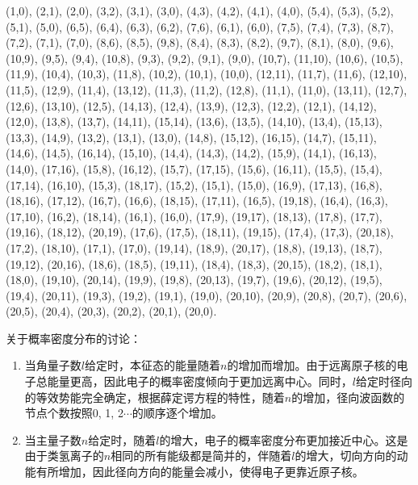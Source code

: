 \begin{enumerate}[label=\textbf{5.\arabic*}, listparindent=\parindent]
\begin{small}
\noindent(1,0), (2,1), (2,0), (3,2), (3,1), (3,0), (4,3), (4,2), (4,1), (4,0), (5,4), (5,3), (5,2), (5,1), (5,0), (6,5), (6,4), (6,3), (6,2), (7,6), (6,1), (6,0), (7,5), (7,4), (7,3), (8,7), (7,2), (7,1), (7,0), (8,6), (8,5), (9,8), (8,4), (8,3), (8,2), (9,7), (8,1), (8,0), (9,6), (10,9), (9,5), (9,4), (10,8), (9,3), (9,2), (9,1), (9,0), (10,7), (11,10), (10,6), (10,5), (11,9), (10,4), (10,3), (11,8), (10,2), (10,1), (10,0), (12,11), (11,7), (11,6), (12,10), (11,5), (12,9), (11,4), (13,12), (11,3), (11,2), (12,8), (11,1), (11,0), (13,11), (12,7), (12,6), (13,10), (12,5), (14,13), (12,4), (13,9), (12,3), (12,2), (12,1), (14,12), (12,0), (13,8), (13,7), (14,11), (15,14), (13,6), (13,5), (14,10), (13,4), (15,13), (13,3), (14,9), (13,2), (13,1), (13,0), (14,8), (15,12), (16,15), (14,7), (15,11), (14,6), (14,5), (16,14), (15,10), (14,4), (14,3), (14,2), (15,9), (14,1), (16,13), (14,0), (17,16), (15,8), (16,12), (15,7), (17,15), (15,6), (16,11), (15,5), (15,4), (17,14), (16,10), (15,3), (18,17), (15,2), (15,1), (15,0), (16,9), (17,13), (16,8), (18,16), (17,12), (16,7), (16,6), (18,15), (17,11), (16,5), (19,18), (16,4), (16,3), (17,10), (16,2), (18,14), (16,1), (16,0), (17,9), (19,17), (18,13), (17,8), (17,7), (19,16), (18,12), (20,19), (17,6), (17,5), (18,11), (19,15), (17,4), (17,3), (20,18), (17,2), (18,10), (17,1), (17,0), (19,14), (18,9), (20,17), (18,8), (19,13), (18,7), (19,12), (20,16), (18,6), (18,5), (19,11), (18,4), (18,3), (20,15), (18,2), (18,1), (18,0), (19,10), (20,14), (19,9), (19,8), (20,13), (19,7), (19,6), (20,12), (19,5), (19,4), (20,11), (19,3), (19,2), (19,1), (19,0), (20,10), (20,9), (20,8), (20,7), (20,6), (20,5), (20,4), (20,3), (20,2), (20,1), (20,0).
\end{small}

关于概率密度分布的讨论：
\begin{enumerate}
    \item 当角量子数$l$给定时，本征态的能量随着$n$的增加而增加。由于远离原子核的电子总能量更高，因此电子的概率密度倾向于更加远离中心。同时，$l$给定时径向的等效势能完全确定，根据薛定谔方程的特性，随着$n$的增加，径向波函数的节点个数按照0, 1, 2$\cdots$的顺序逐个增加。
    \item 当主量子数$n$给定时，随着$l$的增大，电子的概率密度分布更加接近中心。这是由于类氢离子的$n$相同的所有能级都是简并的，伴随着$l$的增大，切向方向的动能有所增加，因此径向方向的能量会减小，使得电子更靠近原子核。
\end{enumerate}


\end{enumerate}

